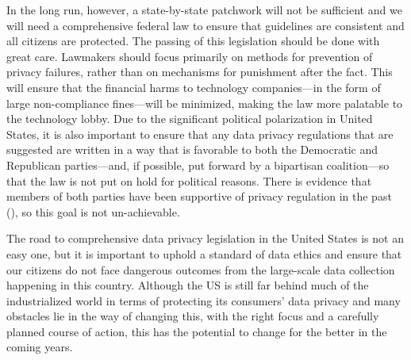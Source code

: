 \documentclass[water,article,submit,moreauthors,pdftex]{mdpi}
\begin{document}
In the long run, however, a state-by-state patchwork will not be
sufficient and we will need a comprehensive federal law to ensure that
guidelines are consistent and all citizens are protected. The passing of
this legislation should be done with great care. Lawmakers should focus
primarily on methods for prevention of privacy failures, rather than on
mechanisms for punishment after the fact. This will ensure that the
financial harms to technology companies---in the form of large
non-compliance fines---will be minimized, making the law more palatable
to the technology lobby. Due to the significant political polarization
in United States, it is also important to ensure that any data privacy
regulations that are suggested are written in a way that is favorable to
both the Democratic and Republican parties---and, if possible, put
forward by a bipartisan coalition---so that the law is not put on hold
for political reasons. There is evidence that members of both parties
have been supportive of privacy regulation in the past
(\citet{privacy-law-bipartisan}), so this goal is not un-achievable.

The road to comprehensive data privacy legislation in the United States
is not an easy one, but it is important to uphold a standard of data
ethics and ensure that our citizens do not face dangerous outcomes from
the large-scale data collection happening in this country. Although the
US is still far behind much of the industrialized world in terms of
protecting its consumers' data privacy and many obstacles lie in the way
of changing this, with the right focus and a carefully planned course of
action, this has the potential to change for the better in the coming
years.

%

\vspace{6pt}



\end{document}
